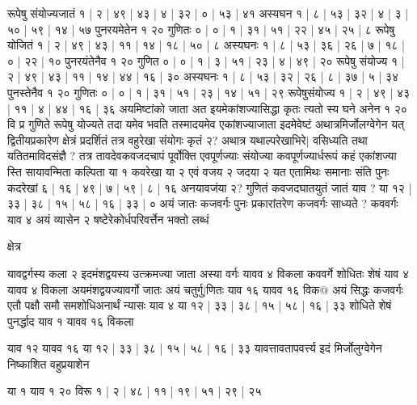\documentclass[12pt]{article}
\begin{document}
{रूपेषु संयोज्यजातं १ | २ | ४९ | ४३ | ४ | ३२ | ० | ५३ | ४१ अस्यघन १ | ८ | ५३ | ३२ | ४ | ३ | ५० | ५९ | १४ | ५७ पुनरयमेतेन १ २० गुणितः ० | ० | १ | ३१ | ५१ | २२ | ४५ | २५ | ८ रूपेषु योजितं १ | २ | ४९ | ४३ | ११ | १४ | १८ | ५० | ८ अस्यघनः १ | ८ | ५३ | ३६ | २६ | ७ | १८ | ० | २२ | १० पुनरयंतेनैव १ २० गुणित ० | ० | १ | ३ | ५१ | २३ | ४ | ४९ | २० रूपेषु संयोज्य १ | २ | ४९ | ४३ | ११ | १४ | ४४ | १६ | ३० अस्यघनः १ | ८ | ५३ | ३२ | २६ | ८ | ३७ | ५ | ३४ पुनस्तेनैव १ २० गुणितः ० | ० | १ | ३१ | ५१ | २३ | १४ | ५१ | २९
रूपेषुसंयोज्य १ | २ | ४९ | ४३ | ११ | ४ | ४४ | १६ | ३६ अयमिष्टांको जाता अत इयमेकांशज्यासिद्धा कृतः त्यतो स्य घने अनेन १ २० वि प्र
गुणिते रूपेषु योज्यते तदा यमेव भवति तस्मादयमेव
एकांशज्याजाता इदमेवेष्टं अथात्रमिर्जोलग्वेगेन
यत् द्वितीयप्रकारेण क्षेत्रं प्रदर्शितं तत्र वहुरेखा संयोगः कृतं २? अथात्र यथाल्परेखाभिरे$|$
वसिध्यति तथा यतितमाविदसंज्ञै ?
तत्र तावदेवकवजदचापं पूर्वोक्ति एवपूर्णज्याः
संयोज्या कवपूर्णज्यार्धरूपं कहं एकांशज्या स्ति
सायावन्मिता कल्पिता या १ कवरेखा या २ एवं वजय २ जदया २ यत एतामिथः
समानाः संति पुनः कदरेखां ६ | १६ | ४९ | ७ | ५९ | ८ | १६ अनयावजंया २?
गुणितं कवजदघातयुतं जातं याव ? या १२ | ३३ | ३८ | १५ | ५८ | १६ | ३३ | ० अयं
जातः कजवर्गः पुनः प्रकारांतरेण कजवर्गः साध्यते ? कववर्गः याव ४
अयं व्यासेन २ षष्टेरेकोर्धपरिवर्त्तेन भक्तो लब्धं

क्षेत्र

यावद्वर्गस्य कला २ इदमंशद्वयस्य उत्क्रमज्या जाता अस्या वर्गः यावव ४
विकला कववर्गे शोधितः शेषं याव ४ यावव ४ विकला अयमंशद्वयज्यावर्गो
जातः अयं चतुर्गु$|$णितः
 याव १६ यावव १६ विक@ अयं
सिद्धः कजवर्गः एतौ पक्षौ समौ समशोधिअनार्थं न्यासः याव ४ या १२ |
३३ | ३८ | १५ | ५८ | १६ | ३३ शोधिते शेषं पुनर्द्धाद
याव १ यावव १६ विकला

याव १२
यावव १६ या १२ | ३३ | ३८ | १५ | ५८ | १६ | ३३ यावत्तावतापवर्त्त्य इदं मिर्जोलुग्वेगेन निष्काशित वहुप्रयाशेन

या १ याव १ २० विरू १ | २ | ४८ | ११ | १९ | ५१ | २९ | २५}

 
\end{document}
